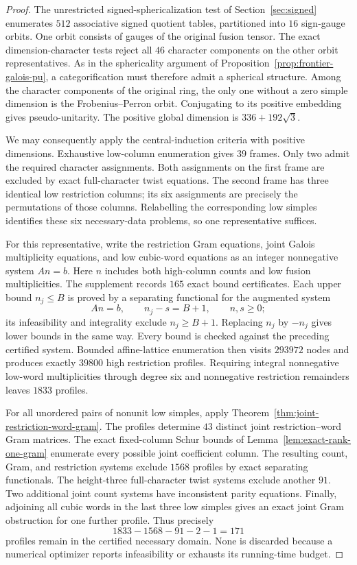 \begin{proof}
The unrestricted signed-sphericalization test of Section~\ref{sec:signed}
enumerates $512$ associative signed quotient tables, partitioned into
$16$ sign-gauge orbits. One orbit consists of gauges of the original
fusion tensor. The exact dimension-character tests reject all $46$
character components on the other orbit representatives. As in the
sphericality argument of Proposition~\ref{prop:frontier-galois-pu}, a
categorification must therefore admit a spherical structure. Among the
character components of the original ring, the only one without a zero
simple dimension is the Frobenius--Perron orbit. Conjugating to its
positive embedding gives pseudo-unitarity. The positive global dimension
is $336+192\sqrt3$.

We may consequently apply the central-induction criteria with positive
dimensions. Exhaustive low-column enumeration gives $39$ frames. Only
two admit the required character assignments. Both assignments on the
first frame are excluded by exact full-character twist equations. The
second frame has three identical low restriction columns; its six
assignments are precisely the permutations of those columns. Relabelling
the corresponding low simples identifies these six necessary-data
problems, so one representative suffices.

For this representative, write the restriction Gram equations, joint
Galois multiplicity equations, and low cubic-word equations as an
integer nonnegative system $An=b$. Here $n$ includes both high-column
counts and low fusion multiplicities. The supplement records $165$
exact bound certificates. Each upper bound $n_j\le B$ is proved by a
separating functional for the augmented system
\[
 An=b,\qquad n_j-s=B+1,\qquad n,s\ge0;
\]
its infeasibility and integrality exclude $n_j\ge B+1$. Replacing $n_j$
by $-n_j$ gives lower bounds in the same way. Every bound is checked
against the preceding certified system. Bounded affine-lattice
enumeration then visits $293972$ nodes and produces exactly $39800$
high restriction profiles. Requiring integral nonnegative low-word
multiplicities through degree six and nonnegative restriction remainders
leaves $1833$ profiles.

For all unordered pairs of nonunit low simples, apply
Theorem~\ref{thm:joint-restriction-word-gram}. The profiles determine
$43$ distinct joint restriction--word Gram matrices. The exact fixed-column
Schur bounds of Lemma~\ref{lem:exact-rank-one-gram} enumerate every possible
joint coefficient column. The resulting count, Gram, and restriction
systems exclude $1568$ profiles by exact separating functionals. The
height-three full-character twist systems exclude another $91$.
Two additional joint count systems have inconsistent parity equations.
Finally, adjoining all cubic words in the last three low simples gives
an exact joint Gram obstruction for one further profile. Thus precisely
\[
 1833-1568-91-2-1=171
\]
profiles remain in the certified necessary domain. None is discarded
because a numerical optimizer reports infeasibility or exhausts its
running-time budget.


\end{proof}
